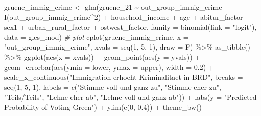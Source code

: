 \documentclass[
]{article}
\newenvironment{Shaded}{\begin{snugshade}}{\end{snugshade}}
\newcommand{\AttributeTok}[1]{\textcolor[rgb]{0.77,0.63,0.00}{#1}}
\newcommand{\CommentTok}[1]{\textcolor[rgb]{0.56,0.35,0.01}{\textit{#1}}}
\newcommand{\DecValTok}[1]{\textcolor[rgb]{0.00,0.00,0.81}{#1}}
\newcommand{\FloatTok}[1]{\textcolor[rgb]{0.00,0.00,0.81}{#1}}
\newcommand{\FunctionTok}[1]{\textcolor[rgb]{0.00,0.00,0.00}{#1}}
\newcommand{\NormalTok}[1]{#1}
\newcommand{\OtherTok}[1]{\textcolor[rgb]{0.56,0.35,0.01}{#1}}
\newcommand{\SpecialCharTok}[1]{\textcolor[rgb]{0.00,0.00,0.00}{#1}}
\newcommand{\StringTok}[1]{\textcolor[rgb]{0.31,0.60,0.02}{#1}}
\begin{document}
\begin{Shaded}
\begin{Highlighting}[]
\NormalTok{gruene\_immig\_crime }\OtherTok{\textless{}{-}} \FunctionTok{glm}\NormalTok{(gruene\_21 }\SpecialCharTok{\textasciitilde{}}\NormalTok{ out\_group\_immig\_crime }\SpecialCharTok{+} \FunctionTok{I}\NormalTok{(out\_group\_immig\_crime}\SpecialCharTok{\^{}}\DecValTok{2}\NormalTok{) }\SpecialCharTok{+}\NormalTok{ household\_income }\SpecialCharTok{+}\NormalTok{ age }\SpecialCharTok{+}\NormalTok{ abitur\_factor }\SpecialCharTok{+}\NormalTok{ sex1 }\SpecialCharTok{+}\NormalTok{ urban\_rural\_factor }\SpecialCharTok{+}\NormalTok{ ostwest\_factor, }\AttributeTok{family =} \FunctionTok{binomial}\NormalTok{(}\AttributeTok{link =} \StringTok{"logit"}\NormalTok{), }\AttributeTok{data =}\NormalTok{ gles\_mod)}
\CommentTok{\# plot }
\FunctionTok{cplot}\NormalTok{(gruene\_immig\_crime, }\AttributeTok{x =} \StringTok{"out\_group\_immig\_crime"}\NormalTok{,}
      \AttributeTok{xvals =} \FunctionTok{seq}\NormalTok{(}\DecValTok{1}\NormalTok{, }\DecValTok{5}\NormalTok{, }\DecValTok{1}\NormalTok{), }\AttributeTok{draw =}\NormalTok{ F) }\SpecialCharTok{\%\textgreater{}\%}
  \FunctionTok{as\_tibble}\NormalTok{() }\SpecialCharTok{\%\textgreater{}\%}
  \FunctionTok{ggplot}\NormalTok{(}\FunctionTok{aes}\NormalTok{(}\AttributeTok{x =}\NormalTok{ xvals)) }\SpecialCharTok{+}
  \FunctionTok{geom\_point}\NormalTok{(}\FunctionTok{aes}\NormalTok{(}\AttributeTok{y =}\NormalTok{ yvals)) }\SpecialCharTok{+}
  \FunctionTok{geom\_errorbar}\NormalTok{(}\FunctionTok{aes}\NormalTok{(}\AttributeTok{ymin =}\NormalTok{ lower, }\AttributeTok{ymax =}\NormalTok{ upper), }\AttributeTok{width =} \FloatTok{0.2}\NormalTok{) }\SpecialCharTok{+}
  \FunctionTok{scale\_x\_continuous}\NormalTok{(}\StringTok{"Immigration erhoeht Kriminalitaet in BRD"}\NormalTok{, }
                     \AttributeTok{breaks =} \FunctionTok{seq}\NormalTok{(}\DecValTok{1}\NormalTok{, }\DecValTok{5}\NormalTok{, }\DecValTok{1}\NormalTok{), }
                     \AttributeTok{labels =} \FunctionTok{c}\NormalTok{(}\StringTok{"Stimme voll und ganz zu"}\NormalTok{, }\StringTok{"Stimme eher zu"}\NormalTok{, }
                                \StringTok{"Teils/Teils"}\NormalTok{, }\StringTok{"Lehne eher ab"}\NormalTok{, }
                                \StringTok{"Lehne voll und ganz ab"}\NormalTok{)) }\SpecialCharTok{+}
  \FunctionTok{labs}\NormalTok{(}\AttributeTok{y =} \StringTok{"Predicted Probability of Voting Green"}\NormalTok{) }\SpecialCharTok{+}
  \FunctionTok{ylim}\NormalTok{(}\FunctionTok{c}\NormalTok{(}\DecValTok{0}\NormalTok{, }\FloatTok{0.4}\NormalTok{)) }\SpecialCharTok{+}
  \FunctionTok{theme\_bw}\NormalTok{() }
\end{Highlighting}
\end{Shaded}
\end{document}
